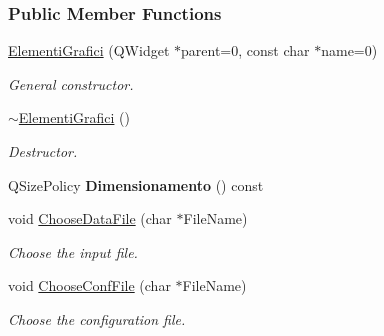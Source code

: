 \subsubsection*{\-Public \-Member \-Functions}
\begin{DoxyCompactItemize}
\item 
\hypertarget{classElementiGrafici_aae49d2145b40fce2fbcee668b2934669}{\hyperlink{classElementiGrafici_aae49d2145b40fce2fbcee668b2934669}{\-Elementi\-Grafici} (\-Q\-Widget $\ast$parent=0, const char $\ast$name=0)}\label{classElementiGrafici_aae49d2145b40fce2fbcee668b2934669}

\begin{DoxyCompactList}\small\item\em \-General constructor. \end{DoxyCompactList}\item 
\hypertarget{classElementiGrafici_ae572bae1d4f4a3c6aa1d40edb62bdaf0}{\hyperlink{classElementiGrafici_ae572bae1d4f4a3c6aa1d40edb62bdaf0}{$\sim$\-Elementi\-Grafici} ()}\label{classElementiGrafici_ae572bae1d4f4a3c6aa1d40edb62bdaf0}

\begin{DoxyCompactList}\small\item\em \-Destructor. \end{DoxyCompactList}\item 
\hypertarget{classElementiGrafici_ab6fbc22c59252cb6152e25ca454a6595}{\-Q\-Size\-Policy {\bfseries \-Dimensionamento} () const }\label{classElementiGrafici_ab6fbc22c59252cb6152e25ca454a6595}

\item 
\hypertarget{classElementiGrafici_a61a52933f2e84207a3ef7c376ce7df38}{void \hyperlink{classElementiGrafici_a61a52933f2e84207a3ef7c376ce7df38}{\-Choose\-Data\-File} (char $\ast$\-File\-Name)}\label{classElementiGrafici_a61a52933f2e84207a3ef7c376ce7df38}

\begin{DoxyCompactList}\small\item\em \-Choose the input file. \end{DoxyCompactList}\item 
\hypertarget{classElementiGrafici_a942934affd7a22cfa6d0297f89217292}{void \hyperlink{classElementiGrafici_a942934affd7a22cfa6d0297f89217292}{\-Choose\-Conf\-File} (char $\ast$\-File\-Name)}\label{classElementiGrafici_a942934affd7a22cfa6d0297f89217292}

\begin{DoxyCompactList}\small\item\em \-Choose the configuration file. \end{DoxyCompactList}\end{DoxyCompactItemize}
